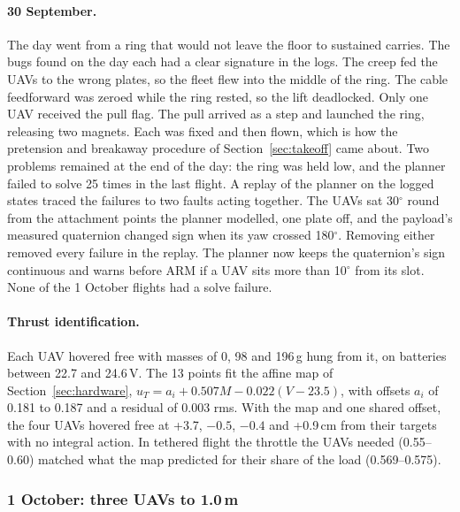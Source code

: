 \paragraph{30 September.} The day went from a ring that would not leave the floor to sustained
carries. The bugs found on the day each had a clear signature in the logs. The creep fed the UAVs to the
wrong plates, so the fleet flew into the middle of the ring. The cable feedforward was zeroed while the
ring rested, so the lift deadlocked. Only one UAV received the pull flag. The pull arrived as a step
and launched the ring, releasing two magnets. Each was fixed and then flown, which is how the
pretension and breakaway procedure of Section~\ref{sec:takeoff} came about. Two problems remained at
the end of the day: the ring was held low, and the planner failed to solve 25 times in the last
flight. A replay of the planner on the logged states traced the failures to two faults acting
together. The UAVs sat 30$^\circ$ round from the attachment points the planner modelled, one plate off,
and the payload's measured quaternion changed sign when its yaw crossed 180$^\circ$. Removing either
removed every failure in the replay. The planner now keeps the quaternion's sign continuous and
warns before ARM if a UAV sits more than 10$^\circ$ from its slot. None of the 1 October flights had a
solve failure.

\paragraph{Thrust identification.} Each UAV hovered free with masses of 0, 98 and 196\,g hung from it,
on batteries between 22.7 and 24.6\,V. The 13 points fit the affine map of
Section~\ref{sec:hardware}, $u_T = a_i + 0.507 M - 0.022 (V - 23.5)$, with offsets $a_i$ of 0.181 to
0.187 and a residual of 0.003 rms. With the map and one shared offset, the four UAVs hovered free at
+3.7, $-0.5$, $-0.4$ and +0.9\,cm from their targets with no integral action. In tethered flight the
throttle the UAVs needed (0.55--0.60) matched what the map predicted for their share of the load
(0.569--0.575).

\subsubsection{1 October: three UAVs to 1.0\,m}

